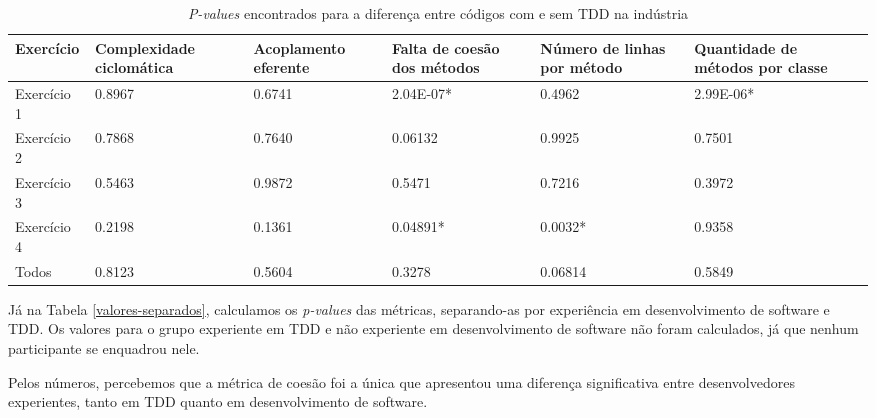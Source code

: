\documentclass[conference]{IEEEtran}
\begin{document}
\begin{table*}
	\centering
	\begin{tabular}{ | p{3cm} | p{2cm} | p{2cm} | p{2cm} | p{2cm} | p{2cm} |}
		\hline
		\textbf{Exercício} & \textbf{Complexidade ciclomática} & \textbf{Acoplamento eferente} & \textbf{Falta de coesão dos métodos} & \textbf{Número de linhas por método} 
		& \textbf{Quantidade de métodos por classe} \\
		\hline
		Exercício 1 &	0.8967	&	0.6741 &	\cellcolor[gray]{0.8}2.04E-07* &	0.4962 &	\cellcolor[gray]{0.8}2.99E-06* \\
		Exercício 2	& 0.7868	&	0.7640 &	0.06132 &	0.9925 &	0.7501 \\
		Exercício 3	& 0.5463	&	0.9872 &	0.5471 &	0.7216 &	0.3972\\
		Exercício 4	& 0.2198	&	0.1361 &	\cellcolor[gray]{0.8}0.04891* &	\cellcolor[gray]{0.8}0.0032* &	0.9358\\
		\hline
		Todos &	0.8123	&	0.5604 &	0.3278 &	0.06814 &	0.5849\\
		\hline
	\end{tabular}
	\caption{\textit{P-values} encontrados para a diferença entre códigos com e sem TDD na indústria}
	\label{metricas-industria}
\end{table*}

Já na Tabela \ref{valores-separados},
calculamos os \textit{p-values} das métricas, separando-as 
por experiência em desenvolvimento de software e TDD. Os valores para o grupo
experiente em TDD e não experiente em desenvolvimento de software não foram calculados, já que nenhum
participante se enquadrou nele.

Pelos números, percebemos 
que a métrica de coesão foi a única que apresentou uma diferença significativa entre desenvolvedores
experientes, tanto em TDD quanto em desenvolvimento de software.
\end{document}
